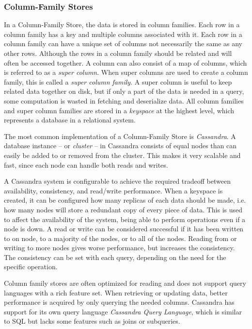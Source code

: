 \subsubsection{Column-Family Stores}

In a Column-Family Store, the data is stored in column families. Each row in a column family has a key and multiple columns associated with it. Each row in a column family can have a unique set of columns not necessarily the same as any other rows. Although the rows in a column family should be related and will often be accessed together. A column can also consist of a map of columns, which is referred to as a \emph{super column}. When super columns are used to create a column family, this is called a \emph{super column family}. A super column is useful to keep related data together on disk, but if only a part of the data is needed in a query, some computation is wasted in fetching and deserialize data. All column families and super column families are stored in a \emph{keyspace} at the highest level, which represents a database in a relational system.

The most common implementation of a Column-Family Store is \emph{Cassandra}. A database instance -- or \emph{cluster} -- in Cassandra consists of equal nodes than can easily be added to or removed from the cluster. This makes it very scalable and fast, since each node can handle both reads and writes.

A Cassandra system is configurable to achieve the required tradeoff between availability, consistency, and read/write performance. When a keyspace is created, it can be configured how many replicas of each data should be made, i.e. how many nodes will store a redundant copy of every piece of data. This is used to affect the availability of the system, being able to perform operations even if a node is down. A read or write can be considered successful if it has been written to on node, to a majority of the nodes, or to all of the nodes. Reading from or writing to more nodes gives worse performance, but increases the consistency. The consistency can be set with each query, depending on the need for the specific operation.

Column family stores are often optimized for reading and does not support query languages with a rich feature set. When retrieving or updating data, better performance is acquired by only querying the needed columns. Cassandra has support for its own query language \emph{Cassandra Query Language}, which is similar to SQL but lacks some features such as joins or subqueries.

